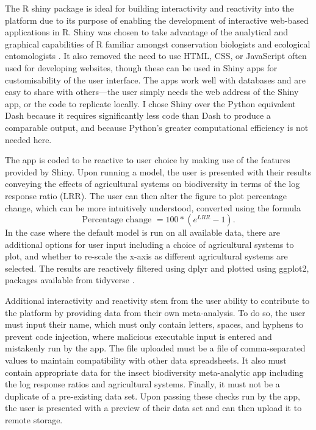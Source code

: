 \documentclass[11pt]{article}
\begin{document}
		\noindent The R shiny package \citep{chang2022shiny} is ideal for building interactivity and reactivity into the platform due to its purpose of enabling the development of interactive web-based applications in R. Shiny was chosen to take advantage of the analytical and graphical capabilities of R familiar amongst conservation biologists and ecological entomologists \citep{lai2019evaluating}. It also removed the need to use HTML, CSS, or JavaScript often used for developing websites, though these can be used in Shiny apps for customisability of the user interface. The apps work well with databases and are easy to share with others—the user simply needs the web address of the Shiny app, or the code to replicate locally. I chose Shiny over the Python equivalent Dash \citep{hossain2019visualization} because it requires significantly less code than Dash to produce a comparable output, and because Python’s greater computational efficiency is not needed here. 
		
		\noindent The app is coded to be reactive to user choice by making use of the features provided by Shiny. Upon running a model, the user is presented with their results conveying the effects of agricultural systems on biodiversity in terms of the log response ratio (LRR). The user can then alter the figure to plot percentage change, which can be more intuitively understood, converted using the formula
		\begin{equation}
		\mbox{Percentage change } = 100 * (e^{LRR} - 1). %
		\end{equation}
		\noindent In the case where the default model is run on all available data, there are additional options for user input including a choice of agricultural systems to plot, and whether to re-scale the x-axis as different agricultural systems are selected. The results are reactively filtered using dplyr and plotted using ggplot2, packages available from tidyverse \citep{wickham2019welcome}. 
		
		\noindent Additional interactivity and reactivity stem from the user ability to contribute to the platform by providing data from their own meta-analysis. To do so, the user must input their name, which must only contain letters, spaces, and hyphens to prevent code injection, where malicious executable input is entered and mistakenly run by the app. The file uploaded must be a file of comma-separated values to maintain compatibility with other data spreadsheets. It also must contain appropriate data for the insect biodiversity meta-analytic app including the log response ratios and agricultural systems. Finally, it must not be a duplicate of a pre-existing data set. Upon passing these checks run by the app, the user is presented with a preview of their data set and can then upload it to remote storage. 
		
\end{document}
